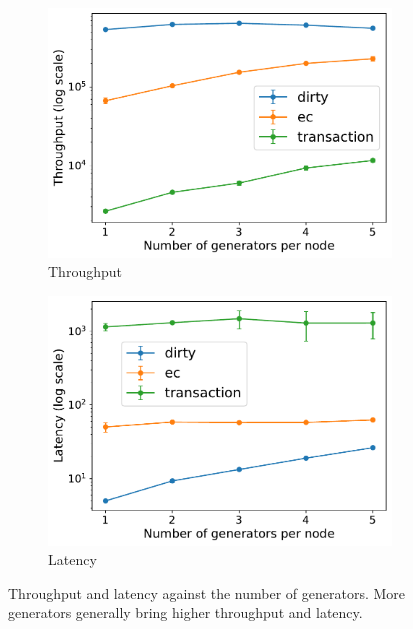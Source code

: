 \begin{figure}[htp]
  \centering
  \begin{subfigure}[t]{0.49\columnwidth}
    \centering
    \includegraphics[width=\columnwidth]{figures/tp_generators_caelum.pdf}
    \caption{Throughput}
    \label{fig:tp generators caelum}
  \end{subfigure}
  \begin{subfigure}[t]{0.49\columnwidth}
    \centering
    \includegraphics[width=\columnwidth]{figures/lat_generators_caelum.pdf}
    \caption{Latency}
    \label{fig:lat generators caelum}
  \end{subfigure}
  \caption{Throughput and latency against the number of generators. More generators
  generally bring higher throughput and latency.}
  \label{fig:generators caelum}
\end{figure}


